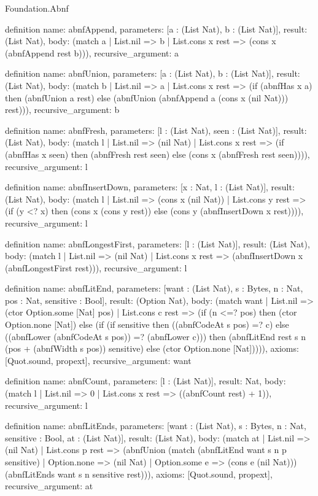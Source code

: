\begin{lexlean}{Foundation.Abnf}
\begin{semanticmodule}
definition{
  name: abnfAppend,
  parameters: [a : (List Nat), b : (List Nat)],
  result: (List Nat),
  body: (match a | List.nil => b | List.cons x rest => (cons x (abnfAppend rest b))),
  recursive_argument: a
}

definition{
  name: abnfUnion,
  parameters: [a : (List Nat), b : (List Nat)],
  result: (List Nat),
  body: (match b
    | List.nil => a
    | List.cons x rest => (if (abnfHas x a) then (abnfUnion a rest) else (abnfUnion (abnfAppend a (cons x (nil Nat))) rest))),
  recursive_argument: b
}

definition{
  name: abnfFresh,
  parameters: [l : (List Nat), seen : (List Nat)],
  result: (List Nat),
  body: (match l
    | List.nil => (nil Nat)
    | List.cons x rest => (if (abnfHas x seen) then (abnfFresh rest seen) else (cons x (abnfFresh rest seen)))),
  recursive_argument: l
}

definition{
  name: abnfInsertDown,
  parameters: [x : Nat, l : (List Nat)],
  result: (List Nat),
  body: (match l
    | List.nil => (cons x (nil Nat))
    | List.cons y rest => (if (y <? x) then (cons x (cons y rest)) else (cons y (abnfInsertDown x rest)))),
  recursive_argument: l
}

definition{
  name: abnfLongestFirst,
  parameters: [l : (List Nat)],
  result: (List Nat),
  body: (match l
    | List.nil => (nil Nat)
    | List.cons x rest => (abnfInsertDown x (abnfLongestFirst rest))),
  recursive_argument: l
}

definition{
  name: abnfLitEnd,
  parameters: [want : (List Nat), s : Bytes, n : Nat, pos : Nat, sensitive : Bool],
  result: (Option Nat),
  body: (match want
    | List.nil => (ctor Option.some [Nat] pos)
    | List.cons c rest => (if (n <=? pos) then (ctor Option.none [Nat]) else (if (if sensitive then ((abnfCodeAt s pos) =? c) else ((abnfLower (abnfCodeAt s pos)) =? (abnfLower c))) then (abnfLitEnd rest s n (pos + (abnfWidth s pos)) sensitive) else (ctor Option.none [Nat])))),
  axioms: [Quot.sound, propext],
  recursive_argument: want
}

definition{
  name: abnfCount,
  parameters: [l : (List Nat)],
  result: Nat,
  body: (match l | List.nil => 0 | List.cons x rest => ((abnfCount rest) + 1)),
  recursive_argument: l
}

definition{
  name: abnfLitEnds,
  parameters: [want : (List Nat), s : Bytes, n : Nat, sensitive : Bool, at : (List Nat)],
  result: (List Nat),
  body: (match at
    | List.nil => (nil Nat)
    | List.cons p rest => (abnfUnion (match (abnfLitEnd want s n p sensitive)
      | Option.none => (nil Nat)
      | Option.some e => (cons e (nil Nat))) (abnfLitEnds want s n sensitive rest))),
  axioms: [Quot.sound, propext],
  recursive_argument: at
}


\end{semanticmodule}
\end{lexlean}
